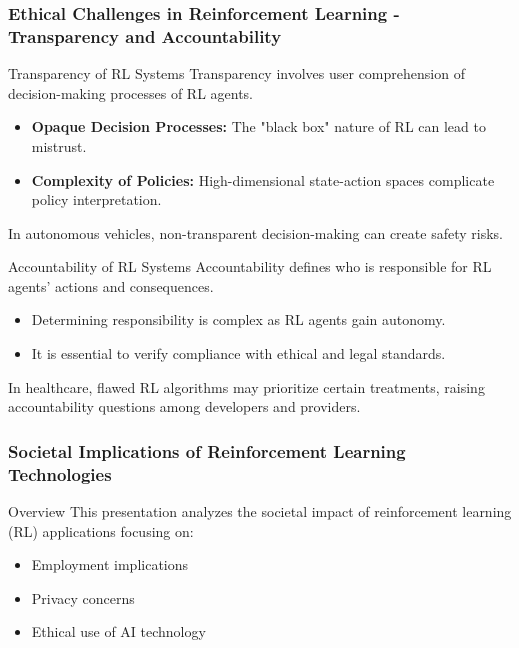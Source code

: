 \documentclass[aspectratio=169]{beamer}
\begin{document}
\begin{frame}[fragile]
    \frametitle{Ethical Challenges in Reinforcement Learning - Transparency and Accountability}
    \begin{block}{Transparency of RL Systems}
        Transparency involves user comprehension of decision-making processes of RL agents.
    \end{block}
    \begin{itemize}
        \item \textbf{Opaque Decision Processes:} The "black box" nature of RL can lead to mistrust.
        \item \textbf{Complexity of Policies:} High-dimensional state-action spaces complicate policy interpretation.
    \end{itemize}
    \begin{example}
        In autonomous vehicles, non-transparent decision-making can create safety risks.
    \end{example}
    
    \begin{block}{Accountability of RL Systems}
        Accountability defines who is responsible for RL agents' actions and consequences.
    \end{block}
    \begin{itemize}
        \item Determining responsibility is complex as RL agents gain autonomy.
        \item It is essential to verify compliance with ethical and legal standards.
    \end{itemize}
    \begin{example}
        In healthcare, flawed RL algorithms may prioritize certain treatments, raising accountability questions among developers and providers.
    \end{example}
\end{frame}

\begin{frame}[fragile]
    \frametitle{Societal Implications of Reinforcement Learning Technologies}
    \begin{block}{Overview}
        This presentation analyzes the societal impact of reinforcement learning (RL) applications focusing on:
        \begin{itemize}
            \item Employment implications
            \item Privacy concerns
            \item Ethical use of AI technology
        \end{itemize}
    \end{block}
\end{frame}
\end{document}
